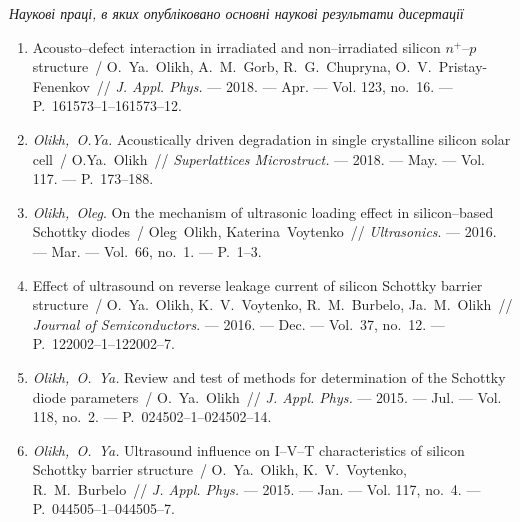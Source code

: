 \begin{center}%
\emph{Наукові праці, в яких опубліковано основні наукові результати дисертації}
\end{center}%
\begin{enumerate}[label=\arabic*.,leftmargin=1em,itemindent=1em]
\item
Acousto--defect interaction in irradiated and non--irradiated silicon
  $n^+$--$p$ structure~/ O.~Ya.~Olikh, A.~M.~Gorb, R.~G.~Chupryna,
  O.~V.~Pristay-Fenenkov~// \emph{J. Appl. Phys.} --- 2018. --- Apr. ---
 Vol. 123, no.~16. --- P.~161573--1--161573--12.

\item
\emph{Olikh,~O.Ya.} Acoustically driven degradation in single crystalline
  silicon solar cell~/ O.Ya.~Olikh~// \emph{Superlattices Microstruct.} ---
  2018. --- May. ---
  Vol. 117. ---
  P.~173--188.

\item
\emph{Olikh,~Oleg}. On the mechanism of ultrasonic loading effect in
  silicon--based {S}chottky diodes~/ Oleg~Olikh, Katerina~Voytenko~//
  \emph{Ultrasonics}. ---
  2016. --- Mar. ---
  Vol.~66, no.~1. ---
  P.~1--3.

\item
Effect of ultrasound on reverse leakage current of silicon {S}chottky barrier
  structure~/ O.~Ya.~Olikh, K.~V.~Voytenko, R.~M.~Burbelo, Ja.~M.~Olikh~//
  \emph{Journal of Semiconductors}. ---
  2016. --- Dec. ---
  Vol.~37, no.~12. ---
  P.~122002--1--122002--7.

\item
\emph{Olikh,~O.~Ya.} Review and test of methods for determination of the
  {S}chottky diode parameters~/ O.~Ya.~Olikh~// \emph{J. Appl. Phys.} ---
  2015. --- Jul. ---
  Vol. 118, no.~2. ---
  P.~024502--1--024502--14.

\item
\emph{Olikh,~O.~Ya.} Ultrasound influence on {I}--{V}--{T} characteristics
  of silicon {S}chottky barrier structure~/ O.~Ya.~Olikh, K.~V.~Voytenko,
  R.~M.~Burbelo~// \emph{J. Appl. Phys.} ---
  2015. --- Jan. ---
  Vol. 117, no.~4. ---
  P.~044505--1--044505--7.


\end{enumerate}
